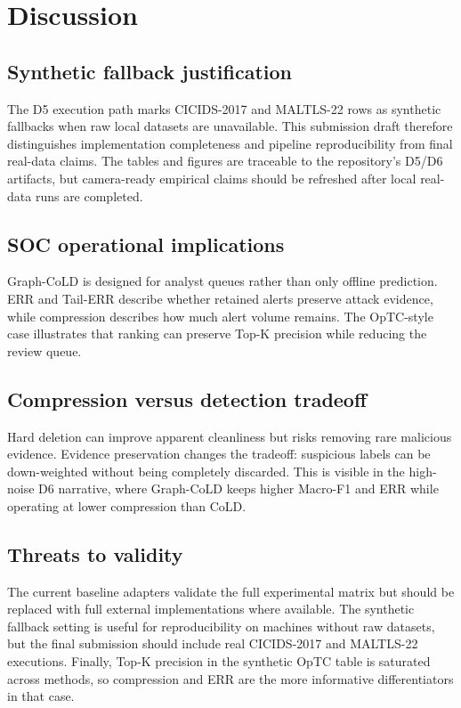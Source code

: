 \documentclass[11pt]{article}
\begin{document}
\section{Discussion}
\subsection{Synthetic fallback justification}
The D5 execution path marks CICIDS-2017 and MALTLS-22 rows as synthetic fallbacks when raw local datasets are unavailable. This submission draft therefore distinguishes implementation completeness and pipeline reproducibility from final real-data claims. The tables and figures are traceable to the repository's D5/D6 artifacts, but camera-ready empirical claims should be refreshed after local real-data runs are completed.

\subsection{SOC operational implications}
Graph-CoLD is designed for analyst queues rather than only offline prediction. ERR and Tail-ERR describe whether retained alerts preserve attack evidence, while compression describes how much alert volume remains. The OpTC-style case illustrates that ranking can preserve Top-K precision while reducing the review queue.

\subsection{Compression versus detection tradeoff}
Hard deletion can improve apparent cleanliness but risks removing rare malicious evidence. Evidence preservation changes the tradeoff: suspicious labels can be down-weighted without being completely discarded. This is visible in the high-noise D6 narrative, where Graph-CoLD keeps higher Macro-F1 and ERR while operating at lower compression than CoLD.

\subsection{Threats to validity}
The current baseline adapters validate the full experimental matrix but should be replaced with full external implementations where available. The synthetic fallback setting is useful for reproducibility on machines without raw datasets, but the final submission should include real CICIDS-2017 and MALTLS-22 executions. Finally, Top-K precision in the synthetic OpTC table is saturated across methods, so compression and ERR are the more informative differentiators in that case.
\end{document}
